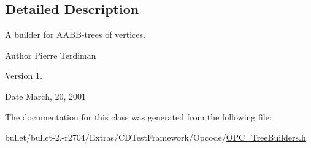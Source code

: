 \subsection{Detailed Description}
A builder for A\+A\+B\+B-\/trees of vertices.

\begin{DoxyAuthor}{Author}
Pierre Terdiman 
\end{DoxyAuthor}
\begin{DoxyVersion}{Version}
1. 
\end{DoxyVersion}
\begin{DoxyDate}{Date}
March, 20, 2001 
\end{DoxyDate}


The documentation for this class was generated from the following file\+:\begin{DoxyCompactItemize}
\item 
bullet/bullet-\/2.-\/r2704/\+Extras/\+C\+D\+Test\+Framework/\+Opcode/\hyperlink{_o_p_c___tree_builders_8h}{O\+P\+C\+\_\+\+Tree\+Builders.\+h}\end{DoxyCompactItemize}
